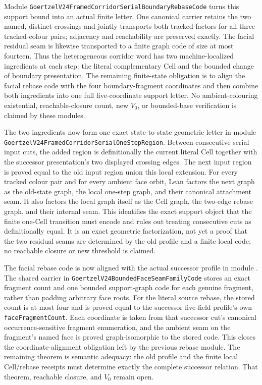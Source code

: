 \documentclass[11pt]{article}
\theoremstyle{definition}
\begin{document}
Module
\texttt{GoertzelV24FramedCorridorSerialBoundaryRebaseCode} turns this support
bound into an actual finite letter.  One canonical carrier retains the two
named, distinct crossings and jointly transports both tracked factors for all
three tracked-colour pairs; adjacency and reachability are preserved exactly.
The facial residual seam is likewise transported to a finite graph code of
size at most fourteen.  Thus the heterogeneous corridor word has two
machine-localized ingredients at each step: the literal complementary Cell
and the bounded change of boundary presentation.  The remaining finite-state
obligation is to align the facial rebase code with the four boundary-fragment
coordinates and then combine both ingredients into one full five-coordinate
support letter.  No ambient-colouring existential, reachable-closure count,
new $V_0$, or bounded-base verification is claimed by these modules.

The two ingredients now form one exact state-to-state geometric letter in
module
\texttt{GoertzelV24FramedCorridorSerialOneStepRegion}.  Between consecutive
serial input cuts, the added region is definitionally the current literal
Cell together with the successor presentation's two displayed crossing
edges.  The next input region is proved equal to the old input region union
this local extension.  For every tracked colour pair and for every ambient
face orbit, Lean factors the next graph as the old-state graph, the local
one-step graph, and their canonical attachment seam.  It also factors the
local graph itself as the Cell graph, the two-edge rebase graph, and their
internal seam.  This identifies the exact support object that the finite
one-Cell transition must encode and rules out treating consecutive cuts as
definitionally equal.  It is an exact geometric factorization, not yet a
proof that the two residual seams are determined by the old profile and a
finite local code; no reachable closure or new threshold is claimed.

The facial rebase code is now aligned with the actual successor profile in
module
.
The shared carrier in
\texttt{GoertzelV24BoundedFaceSeamFamilyCode} stores an exact fragment count
and one bounded support-graph code for each genuine fragment, rather than
padding arbitrary face roots.  For the literal source rebase, the stored count
is at most four and is proved equal to the successor five-field profile's own
\texttt{faceFragmentCount}.  Each coordinate is taken from that successor
cut's canonical occurrence-sensitive fragment enumeration, and the ambient
seam on the fragment's named face is proved graph-isomorphic to the stored
code.  This closes the coordinate-alignment obligation left by the previous
rebase module.  The remaining theorem is semantic adequacy: the old profile
and the finite local Cell/rebase receipts must determine exactly the complete
successor relation.  That theorem, reachable closure, and $V_0$ remain open.
\end{document}
